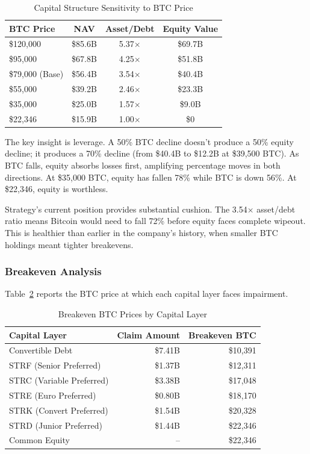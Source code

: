 \begin{table}[H]
\centering
\caption{Capital Structure Sensitivity to BTC Price}
\label{tab:sensitivity}
\begin{tabular}{@{}lccc@{}}
\toprule
\textbf{BTC Price} & \textbf{NAV} & \textbf{Asset/Debt} & \textbf{Equity Value} \\
\midrule
\$120,000 & \$85.6B & 5.37$\times$ & \$69.7B \\
\$95,000 & \$67.8B & 4.25$\times$ & \$51.8B \\
\$79,000 (Base) & \$56.4B & 3.54$\times$ & \$40.4B \\
\$55,000 & \$39.2B & 2.46$\times$ & \$23.3B \\
\$35,000 & \$25.0B & 1.57$\times$ & \$9.0B \\
\$22,346 & \$15.9B & 1.00$\times$ & \$0 \\
\bottomrule
\end{tabular}
\end{table}

The key insight is leverage. A 50\% BTC decline doesn't produce a 50\% equity decline; it produces a 70\% decline (from \$40.4B to \$12.2B at \$39,500 BTC). As BTC falls, equity absorbs losses first, amplifying percentage moves in both directions. At \$35,000 BTC, equity has fallen 78\% while BTC is down 56\%. At \$22,346, equity is worthless.

Strategy's current position provides substantial cushion. The 3.54$\times$ asset/debt ratio means Bitcoin would need to fall 72\% before equity faces complete wipeout. This is healthier than earlier in the company's history, when smaller BTC holdings meant tighter breakevens.

\subsubsection{Breakeven Analysis}

Table~\ref{tab:breakeven} reports the BTC price at which each capital layer faces impairment.

\begin{table}[H]
\centering
\caption{Breakeven BTC Prices by Capital Layer}
\label{tab:breakeven}
\begin{tabular}{@{}lrr@{}}
\toprule
\textbf{Capital Layer} & \textbf{Claim Amount} & \textbf{Breakeven BTC} \\
\midrule
Convertible Debt & \$7.41B & \$10,391 \\
STRF (Senior Preferred) & \$1.37B & \$12,311 \\
STRC (Variable Preferred) & \$3.38B & \$17,048 \\
STRE (Euro Preferred) & \$0.80B & \$18,170 \\
STRK (Convert Preferred) & \$1.54B & \$20,328 \\
STRD (Junior Preferred) & \$1.44B & \$22,346 \\
Common Equity & -- & \$22,346 \\
\bottomrule
\end{tabular}
\end{table}

